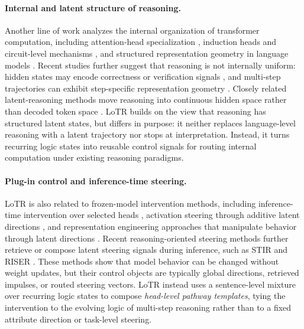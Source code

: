 \paragraph{Internal and latent structure of reasoning.}
Another line of work analyzes the internal organization of transformer computation, including attention-head specialization \citep{michel2019sixteen,voita2019analyzing}, induction heads and circuit-level mechanisms \citep{olsson2022induction}, and structured representation geometry in language models \citep{zou2023representationengineering}. Recent studies further suggest that reasoning is not internally uniform: hidden states may encode correctness or verification signals \citep{zhang2025reasoningmodels}, and multi-step trajectories can exhibit step-specific representation geometry \citep{sun2026trajectories}. Closely related latent-reasoning methods move reasoning into continuous hidden space rather than decoded token space \citep{hao2024coconut}. LoTR builds on the view that reasoning has structured latent states, but differs in purpose: it neither replaces language-level reasoning with a latent trajectory nor stops at interpretation. Instead, it turns recurring logic states into reusable control signals for routing internal computation under existing reasoning paradigms.
\vspace{-1mm}

\paragraph{Plug-in control and inference-time steering.}
LoTR is also related to frozen-model intervention methods, including inference-time intervention over selected heads \citep{li2023inference}, activation steering through additive latent directions \citep{rimsky2024caa,turner2024actadd}, and representation engineering approaches that manipulate behavior through latent directions \citep{zou2023representationengineering}. Recent reasoning-oriented steering methods further retrieve or compose latent steering signals during inference, such as STIR and RISER \citep{shi2026stir,ye2026riser}. These methods show that model behavior can be changed without weight updates, but their control objects are typically global directions, retrieved impulses, or routed steering vectors. LoTR instead uses a sentence-level mixture over recurring logic states to compose \emph{head-level pathway templates}, tying the intervention to the evolving logic of multi-step reasoning rather than to a fixed attribute direction or task-level steering.
\vspace{-1mm}

